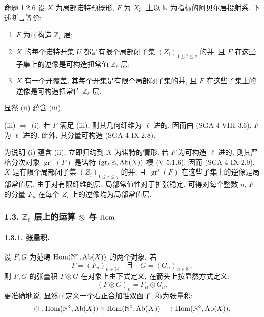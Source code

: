 \begin{statement}{命题 1.2.6}
设 \(X\) 为局部诺特预概形, \(F\) 为 \(X_{\mathrm{\acute et}}\) 上以 \(\mathbb N\) 为指标的阿贝尔层投射系. 下述断言等价:
\begin{enumerate}[label=(\roman*)]
\item \(F\) 为可构造 \(\mathbb Z_\ell\) 层;
\item \(X\) 的每个诺特开集 \(U\) 都是有限个局部闭子集 \((Z_i)_{1\le i\le q}\) 的并, 且 \(F\) 在这些子集上的逆像是可构造扭常值 \(\mathbb Z_\ell\) 层;
\item \(X\) 有一个开覆盖, 其每个开集是有限个局部闭子集的并, 且 \(F\) 在这些子集上的逆像是可构造扭常值 \(\mathbb Z_\ell\) 层.
\end{enumerate}
\end{statement}

\begin{prooftext}[证明]
显然 (ii) 蕴含 (iii).

(iii) \(\Longrightarrow\) (i): 若 \(F\) 满足 (iii), 则其几何纤维为 \(\ell\) 进的, 因而由 (SGA 4 VIII 3.6), \(F\) 为 \(\ell\) 进的. 此外, 其分量可构造 (SGA 4 IX 2.8).

为说明 (i) 蕴含 (ii), 立即归约到 \(X\) 为诺特的情形. 若 \(F\) 为可构造 \(\ell\) 进的, 则其严格分次对象 \(\operatorname{gr}^s(F)\) 是诺特 \((\operatorname{gr}_\ell\mathbb Z,\operatorname{Ab}(X))\) 模 (V 5.1.6). 因而 (SGA 4 IX 2.9), \(X\) 是有限个局部闭子集 \((Z_i)_{1\le i\le q}\) 的并, 且 \(\operatorname{gr}^s(F)\) 在这些子集上的逆像是局部常值层. 由于对有限纤维的层, 局部常值性对于扩张稳定, 可得对每个整数 \(n\), \(F\) 的分量 \(F_n\) 在每个 \(Z_i\) 上的逆像均为局部常值层.
\end{prooftext}

\subsubsection*{1.3. \(\mathbb Z_\ell\) 层上的运算 \(\otimes\) 与 \(\operatorname{Hom}\)}

\paragraph{1.3.1. 张量积.}
设 \(F,G\) 为范畴 \(\operatorname{Hom}(\mathbb N^\circ,\operatorname{Ab}(X))\) 的两个对象. 若
\[
F=(F_n)_{n\in\mathbb N}\quad\text{且}\quad G=(G_n)_{n\in\mathbb N},
\]
则 \(F,G\) 的张量积 \(F\otimes G\) 在对象上由下式定义, 在箭头上按显然方式定义:
\[
(F\otimes G)_n=F_n\otimes G_n.
\]
更准确地说, 显然可定义一个右正合加性双函子, 称为张量积:
\[
\otimes:\operatorname{Hom}(\mathbb N^\circ,\operatorname{Ab}(X))\times \operatorname{Hom}(\mathbb N^\circ,\operatorname{Ab}(X))
\longrightarrow \operatorname{Hom}(\mathbb N^\circ,\operatorname{Ab}(X)).
\]

